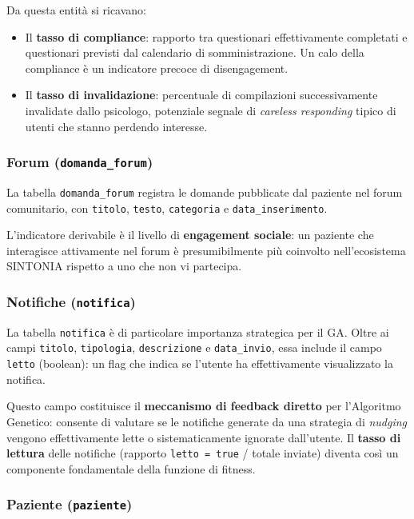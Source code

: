 Da questa entità si ricavano:
\begin{itemize}
    \item Il \textbf{tasso di compliance}: rapporto tra questionari effettivamente completati e questionari previsti dal calendario di somministrazione. Un calo della compliance è un indicatore precoce di disengagement.
    \item Il \textbf{tasso di invalidazione}: percentuale di compilazioni successivamente invalidate dallo psicologo, potenziale segnale di \textit{careless responding} tipico di utenti che stanno perdendo interesse.
\end{itemize}

\subsubsection{Forum (\texttt{domanda\_forum})}

La tabella \texttt{domanda\_forum} registra le domande pubblicate dal paziente nel forum comunitario, con \texttt{titolo}, \texttt{testo}, \texttt{categoria} e \texttt{data\_inserimento}.

L'indicatore derivabile è il livello di \textbf{engagement sociale}: un paziente che interagisce attivamente nel forum è presumibilmente più coinvolto nell'ecosistema SINTONIA rispetto a uno che non vi partecipa.

\subsubsection{Notifiche (\texttt{notifica})}

La tabella \texttt{notifica} è di particolare importanza strategica per il GA. Oltre ai campi \texttt{titolo}, \texttt{tipologia}, \texttt{descrizione} e \texttt{data\_invio}, essa include il campo \texttt{letto} (boolean): un flag che indica se l'utente ha effettivamente visualizzato la notifica.

Questo campo costituisce il \textbf{meccanismo di feedback diretto} per l'Algoritmo Genetico: consente di valutare se le notifiche generate da una strategia di \textit{nudging} vengono effettivamente lette o sistematicamente ignorate dall'utente. Il \textbf{tasso di lettura} delle notifiche (rapporto \texttt{letto = true} / totale inviate) diventa così un componente fondamentale della funzione di fitness.

\subsubsection{Paziente (\texttt{paziente})}

